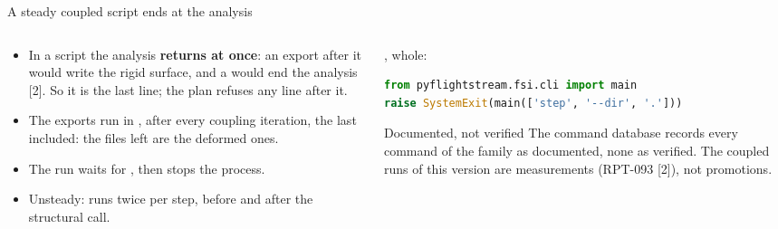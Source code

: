 \begin{frame}[fragile]{A steady coupled script ends at the analysis}
\begin{columns}[T]
\begin{column}{0.52\textwidth}
\begin{itemize}\footnotesize
  \item In a script the analysis \textbf{returns at once}: an export after it
        would write the rigid surface, and a  would
        end the analysis [2]. So it is the last line; the plan refuses any
        line after it.
  \item The exports run in , after every coupling
        iteration, the last included: the files left are the deformed ones.
  \item The run waits for , then stops the
        process.
  \item Unsteady:  runs twice per step, before and after
        the structural call.
\end{itemize}
\end{column}
\begin{column}{0.44\textwidth}
\scriptsize {}, whole:
\begin{lstlisting}[style=ftsbase, language=Python, basicstyle=\ttfamily\tiny]
from pyflightstream.fsi.cli import main
raise SystemExit(main(['step', '--dir', '.']))
\end{lstlisting}
\begin{alertblock}{Documented, not verified}
\scriptsize The command database records every command of the family as
documented, none as verified. The coupled runs of this version are
measurements (RPT-093 [2]), not promotions.
\end{alertblock}
\end{column}
\end{columns}
\end{frame}


